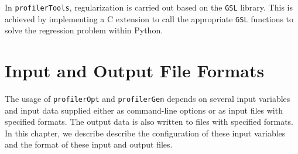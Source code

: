 \documentclass[10pt,a4paper,openany]{memoir}
\numberwithin{equation}{section}
\newcommand{\profileropt}[0]{\texttt{profilerOpt}}
\newcommand{\profilergen}[0]{\texttt{profilerGen}}
\newcommand{\profilertools}[0]{\texttt{profilerTools}}
\begin{document}
In \profilertools{}, regularization is carried out based on the
\texttt{GSL} library.  This is achieved by implementing a C extension
to call the appropriate \texttt{GSL} functions to solve the regression
problem within Python.

\chapter{Input and Output File Formats}
\label{chap:file-formats}

The usage of \profileropt{} and \profilergen{} depends on several
input variables and input data supplied either as command-line options
or as input files with specified formats. The output data is also
written to files with specified formats. In this chapter, we describe
describe the configuration of these input variables and the format of
these input and output files.




\end{document}
